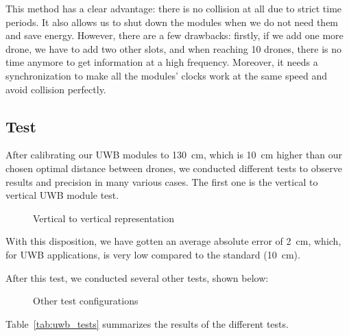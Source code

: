 \documentclass[conference]{IEEEtran}
\begin{document}
\noindent This method has a clear advantage: there is no collision at all due
to strict time periods. It also allows us to shut down the modules when we do
not need them and save energy. However, there are a few drawbacks: firstly,
if we add one more drone, we have to add two other slots, and when reaching
10 drones, there is no time anymore to get information at a high frequency.
Moreover, it needs a synchronization to make all the modules' clocks work at
the same speed and avoid collision perfectly.

\subsection{Test}
After calibrating our UWB modules to 130~cm, which is 10~cm higher than our chosen
optimal distance between drones, we conducted different tests to observe
results and precision in many various cases.
The first one is the vertical to vertical UWB module test.
\begin{figure}[H]
    \centering
    \resizebox{0.8\linewidth}{!}{\FtFVertical}
    \caption{Vertical to vertical representation}
    \label{fig:FtFVertical}
\end{figure}
With this disposition, we have gotten an average absolute error of 2~cm,
which, for UWB applications, is very low compared to the standard (10~cm).

After this test, we conducted several other tests, shown below:
\begin{figure}[H]
    \centering
    \begin{minipage}{0.48\linewidth}
        \centering
        \resizebox{\linewidth}{!}{\FtFhorizontale}
        \label{fig:FtFHorizontal}
    \end{minipage}\hfill
    \begin{minipage}{0.48\linewidth}
        \centering
        \resizebox{\linewidth}{!}{\SchemaParalleles}
        \label{fig:Paralleles}
    \end{minipage}

    \vspace{1em}

    \begin{minipage}{0.48\linewidth}
        \centering
        \resizebox{\linewidth}{!}{\Schemarayon}
        \label{fig:Rayon}
    \end{minipage}\hfill
    \begin{minipage}{0.48\linewidth}
        \centering
        \resizebox{\linewidth}{!}{\FtB}
        \label{fig:FtB}
    \end{minipage}
    \caption{Other test configurations}
    \label{fig:OtherTests}
\end{figure}
Table~\ref{tab:uwb_tests} summarizes the results of the different tests.
\end{document}
